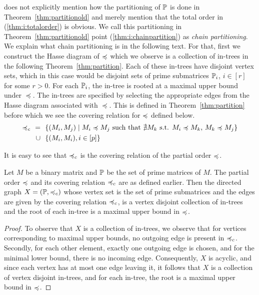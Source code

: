 \cite{nsnrs09} does not explicitly mention how the partitioning of
$\mathbb P$ is done in Theorem~\ref{thm:partitionold} and merely mention
that the total order in (\ref{thm:i:totalorder}) is obvious. We call
this partitioning in Theorem~\ref{thm:partitionold} point
(\ref{thm:i:chainpartition}) as {\em chain partitioning}. We explain
what chain partitioning is in the following text. For that, first we
construct the Hasse diagram of $\preccurlyeq$ which we observe is a
collection of in-trees in the following Theorem~\ref{thm:partition}.
Each of these in-trees have disjoint vertex sets,
which in this case would be disjoint sets of prime submatrices
$\mathbb P_i$, $i \in [r]$ for some $r > 0$.  For each $\mathbb P_i$, the in-tree
is rooted at a maximal upper bound under $\preccurlyeq$.  The in-trees
are specified by selecting the appropriate edges from the Hasse
diagram associated with $\preccurlyeq$. This is defined in
Theorem~\ref{thm:partition} before which we see the covering relation
for $\preccurlyeq$ defined below.
\begin{align*}
  \primeless_c \ \  = \ \ &\{ (M_i,M_j) \mid M_i \primeless M_j \text{ \stt\ } \nexists
  M_k \text{ s.t. } M_i \primeless M_k \text{, } M_k \primeless M_j \} \\
  \cup \ \ &\{ (M_i,M_i), i \in [p] \}
\end{align*}

It is easy to see that $\preccurlyeq_c$ is the covering relation of the partial
order $\preccurlyeq$.




\begin{theorem}%
  \label{thm:partition} %
  Let $M$ be a binary matrix and $\mathbb P$ be the set of prime matrices of
  $M$. The partial order $\preccurlyeq$ and its covering relation
  $\preccurlyeq_c$ are as defined earlier.
  Then the directed graph $X = (\mathbb P, \preccurlyeq_c)$ whose vertex
  set is the set of prime submatrices and the edges are given
  by the covering relation $\preccurlyeq_c$, is a vertex
  disjoint collection of in-trees and the root of each in-tree is a
  maximal upper bound in $\preccurlyeq$.
\end{theorem}
\begin{proof}\thesisspacing
  To observe that $X$ is a collection of in-trees, we observe that for
  vertices corresponding to maximal upper bounds, no outgoing edge is
  present in $\preccurlyeq_c$.  Secondly, for each other element,
  exactly one outgoing edge is chosen, and for the minimal lower
  bound, there is no incoming edge.  Consequently, $X$ is acyclic, and
  since each vertex has at most one edge leaving it, it follows that
  $X$ is a collection of vertex disjoint in-trees, and for each
  in-tree, the root is a maximal upper bound in $\preccurlyeq$.
\end{proof}


